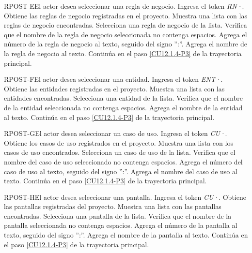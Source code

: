 	\begin{UCtrayectoriaA}{RPOST-E}{El actor desea seleccionar una regla de negocio.}
		\UCpaso[\UCactor] Ingresa el token {\em RN·}. 
		\UCpaso[\UCsist] Obtiene las reglas de negocio registradas en el proyecto.
		\UCpaso[\UCsist] Muestra una lista con las reglas de negocio encontradas.
		\UCpaso[\UCactor] Selecciona una regla de negocio de la lista.
		\UCpaso[\UCsist] Verifica que el nombre de la regla de negocio seleccionada no contenga espacios. 
		\UCpaso[\UCsist] Agrega el número de la regla de negocio al texto, seguido del signo '':''.
		\UCpaso[\UCsist] Agrega el nombre de la regla de negocio al texto.
		\UCpaso Continúa en el paso \ref{CU12.1.4-P3} de la trayectoria principal.
	\end{UCtrayectoriaA}

	\begin{UCtrayectoriaA}{RPOST-F}{El actor desea seleccionar una entidad.}
		\UCpaso[\UCactor] Ingresa el token {\em ENT·}. 
		\UCpaso[\UCsist] Obtiene las entidades registradas en el proyecto.
		\UCpaso[\UCsist] Muestra una lista con las entidades encontradas.
		\UCpaso[\UCactor] Selecciona una entidad de la lista.
		\UCpaso[\UCsist] Verifica que el nombre de la entidad seleccionada no contenga espacios. 
		\UCpaso[\UCsist] Agrega el nombre de la entidad al texto.
		\UCpaso Continúa en el paso \ref{CU12.1.4-P3} de la trayectoria principal.
	\end{UCtrayectoriaA}

	\begin{UCtrayectoriaA}{RPOST-G}{El actor desea seleccionar un caso de uso.}
		\UCpaso[\UCactor] Ingresa el token {\em CU·}. 
		\UCpaso[\UCsist] Obtiene los casos de uso registrados en el proyecto.
		\UCpaso[\UCsist] Muestra una lista con los casos de uso encontrados.
		\UCpaso[\UCactor] Selecciona un caso de uso de la lista.
		\UCpaso[\UCsist] Verifica que el nombre del caso de uso seleccionado no contenga espacios. 
		\UCpaso[\UCsist] Agrega el número del caso de uso al texto, seguido del signo '':''.
		\UCpaso[\UCsist] Agrega el nombre del caso de uso al texto.
		\UCpaso Continúa en el paso \ref{CU12.1.4-P3} de la trayectoria principal.
	\end{UCtrayectoriaA}

	\begin{UCtrayectoriaA}{RPOST-H}{El actor desea seleccionar una pantalla.}
		\UCpaso[\UCactor] Ingresa el token {\em CU·}. 
		\UCpaso[\UCsist] Obtiene las pantallas registradas del proyecto.
		\UCpaso[\UCsist] Muestra una lista con las pantallas encontradas.
		\UCpaso[\UCactor] Selecciona una pantalla de la lista.
		\UCpaso[\UCsist] Verifica que el nombre de la pantalla seleccionada no contenga espacios. 
		\UCpaso[\UCsist] Agrega el número de la pantalla al texto, seguido del signo '':''.
		\UCpaso[\UCsist] Agrega el nombre de la pantalla al texto.
		\UCpaso Continúa en el paso \ref{CU12.1.4-P3} de la trayectoria principal.
	\end{UCtrayectoriaA}

